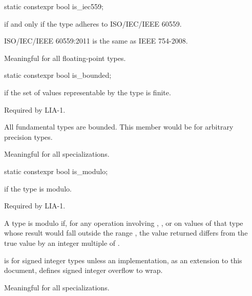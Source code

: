 %
\begin{itemdecl}
static constexpr bool is_iec559;
\end{itemdecl}

\begin{itemdescr}
\pnum
{} if and only if the type adheres to ISO/IEC/IEEE
60559.
\begin{footnote}
ISO/IEC/IEEE 60559:2011 is the same as IEEE 754-2008.
\end{footnote}

\pnum
Meaningful for all floating-point types.
\end{itemdescr}

%
\begin{itemdecl}
static constexpr bool is_bounded;
\end{itemdecl}

\begin{itemdescr}
\pnum
{} if the set of values representable by the type is finite.
\begin{footnote}
Required by LIA-1.
\end{footnote}
\begin{note}
All fundamental types are bounded. This member would be  for arbitrary
precision types.
\end{note}

\pnum
Meaningful for all specializations.
\end{itemdescr}

%
\begin{itemdecl}
static constexpr bool is_modulo;
\end{itemdecl}

\begin{itemdescr}
\pnum
{} if the type is modulo.
\begin{footnote}
Required by LIA-1.
\end{footnote}
A type is modulo if, for any operation involving \tcode{+}, \tcode{-}, or
\tcode{*} on values of that type whose result would fall outside the range
, the value returned differs from the true value by an
integer multiple of .

\pnum
\begin{example}
 is  for signed integer types
unless an implementation, as an extension to this document,
defines signed integer overflow to wrap.
\end{example}

\pnum
Meaningful for all specializations.
\end{itemdescr}

